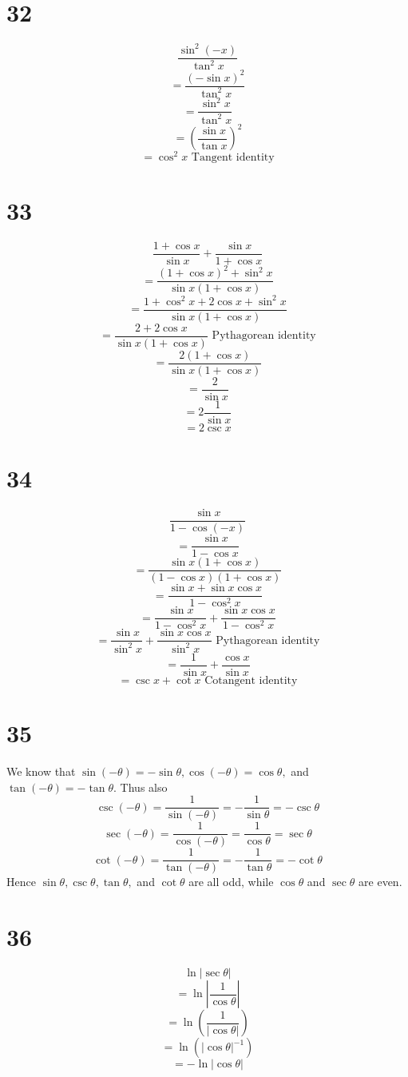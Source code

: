 \documentclass{article}
\theoremstyle{definition}
\newcommand{\?}{\stackrel{?}{=}}
\begin{document}
\section*{32}
\[ \frac{\sin ^2(-x)}{\tan ^2x} \]
\[ =\frac{(-\sin x)^2}{\tan ^2x} \]
\[ =\frac{\sin^2 x}{\tan ^2x} \]
\[ =(\frac{\sin x}{\tan x})^2 \]
\[ =\cos^2 x\textrm{ Tangent identity} \]

\section*{33}
\[ \frac{1+\cos x}{\sin x}+\frac{\sin x}{1+\cos x} \]
\[ =\frac{(1+\cos x)^2+\sin ^2x}{\sin x(1+\cos x)} \]
\[ =\frac{1+\cos^2 x+2\cos x+\sin ^2x}{\sin x(1+\cos x)} \]
\[ =\frac{2+2\cos x}{\sin x(1+\cos x)}\textrm{ Pythagorean identity} \]
\[ =\frac{2(1+\cos x)}{\sin x(1+\cos x)} \]
\[ =\frac{2}{\sin x} \]
\[ =2\frac{1}{\sin x} \]
\[ =2\csc x \]

\section*{34}
\[ \frac{\sin x}{1-\cos(-x)} \]
\[ =\frac{\sin x}{1-\cos x} \]
\[ =\frac{\sin x(1+\cos x)}{(1-\cos x)(1+\cos x)} \]
\[ =\frac{\sin x+\sin x\cos x}{1-\cos^2 x} \]
\[ =\frac{\sin x}{1-\cos^2 x}+\frac{\sin x\cos x}{1-\cos^2 x} \]
\[ =\frac{\sin x}{\sin^2 x}+\frac{\sin x\cos x}{\sin^2 x}\textrm{ Pythagorean identity} \]
\[ =\frac{1}{\sin x}+\frac{\cos x}{\sin x} \]
\[ =\csc x+\cot x\textrm{ Cotangent identity} \]

\section*{35}
We know that $\sin(-\theta)=-\sin\theta,\cos(-\theta)=\cos\theta,$ and $\tan(-\theta)=-\tan\theta$. Thus also
\[ \csc(-\theta)=\frac{1}{\sin(-\theta)}=-\frac{1}{\sin\theta}=-\csc\theta \]
\[ \sec(-\theta)=\frac{1}{\cos(-\theta)}=\frac{1}{\cos\theta}=\sec\theta \]
\[ \cot(-\theta)=\frac{1}{\tan(-\theta)}=-\frac{1}{\tan\theta}=-\cot\theta \] Hence 
$\sin\theta,\csc\theta,\tan\theta,$ and $\cot\theta$ are all odd, while $\cos\theta$ and $\sec\theta$ are even.

\section*{36}
\[ \ln|\sec\theta| \]
\[ =\ln|\frac{1}{\cos\theta}| \]
\[ =\ln(\frac{1}{|\cos\theta|}) \]
\[ =\ln(|\cos\theta|^{-1}) \]
\[ =-\ln|\cos\theta| \]
\end{document}

